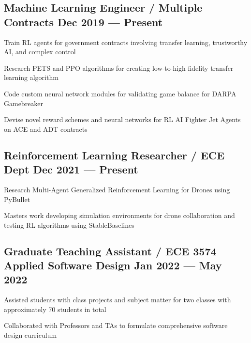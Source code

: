 \subsection{{Machine Learning Engineer / Multiple Contracts \hfill Dec 2019 --- Present}}
\begin{zitemize}
	\item Train RL agents for government contracts involving transfer learning, trustworthy AI, and complex control
	\item Research PETS and PPO algorithms for creating low-to-high fidelity transfer learning algorithm
	\item Code custom neural network modules for validating game balance for DARPA Gamebreaker
	\item Devise novel reward schemes and neural networks for RL AI Fighter Jet Agents on ACE and ADT contracts
\end{zitemize}

\subsection{{Reinforcement Learning Researcher / ECE Dept  \hfill Dec 2021 --- Present}}
\begin{zitemize}
	\item Research Multi-Agent Generalized Reinforcement Learning for Drones using PyBullet
	\item Masters work developing simulation environments for drone collaboration and testing RL algorithms using StableBaselines
\end{zitemize}

\subsection{{Graduate Teaching Assistant / ECE 3574 Applied Software Design  \hfill Jan 2022 --- May 2022}}
\begin{zitemize}
	\item Assisted students with class projects and subject matter for two classes with approximately 70 students in
	total
	\item Collaborated with Professors and TAs to formulate comprehensive software design curriculum
\end{zitemize}

